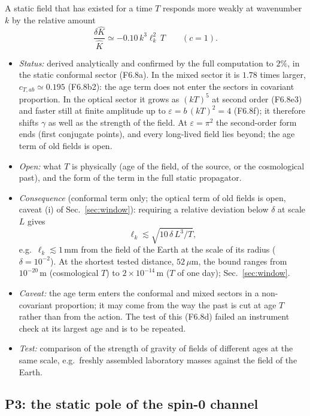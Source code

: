 A static field that has existed for a time $T$ responds more weakly at wavenumber $k$ by the relative
amount
\begin{equation}
  \frac{\delta\hat K}{\hat K}\simeq-0.10\,k^3\ell_k^2\,T\qquad(c=1).
\end{equation}
\begin{itemize}
\item \emph{Status:} derived analytically and confirmed by the full computation to $2\%$, in the static
  conformal sector (F6.8a). In the mixed sector it is $1.78$ times larger, $c_{T,ab}\simeq0.195$
  (F6.8b2): the age term does not enter the sectors in covariant proportion. In the optical sector it grows as
  $(kT)^5$ at second order (F6.8e3) and faster still at finite amplitude up to $\varepsilon=b\,(kT)^2=4$ (F6.8f);
  it therefore shifts $\gamma$ as well as the strength of the field. At $\varepsilon=\pi^2$ the second-order form
  ends (first conjugate points), and every long-lived field lies beyond; the age term of old fields is open.
\item \emph{Open:} what $T$ is physically (age of the field, of the source, or the cosmological past),
  and the form of the term in the full static propagator.
\item \emph{Consequence} (conformal term only; the optical term of old fields is open, caveat (i) of
  Sec.~\ref{sec:window}): requiring a relative deviation below $\delta$ at scale $L$ gives
  \begin{equation}
    \ell_k\lesssim\sqrt{10\,\delta\,L^3/T},
  \end{equation}
  e.g.\ $\ell_k\lesssim1$\,mm from the field of the Earth at the scale of its radius ($\delta=10^{-2}$). At the
  shortest tested distance, $52\,\mu$m, the bound ranges from $10^{-20}$\,m (cosmological $T$) to
  $2\times10^{-14}$\,m ($T$ of one day); Sec.~\ref{sec:window}.
\item \emph{Caveat:} the age term enters the conformal and mixed sectors in a non-covariant proportion; it may
  come from the way the past is cut at age $T$ rather than from the action. The test of this (F6.8d) failed
  an instrument check at its largest age and is to be repeated.
\item \emph{Test:} comparison of the strength of gravity of fields of different ages at the same scale,
  e.g.\ freshly assembled laboratory masses against the field of the Earth.
\end{itemize}

\subsection{P3: the static pole of the spin-0 channel}

